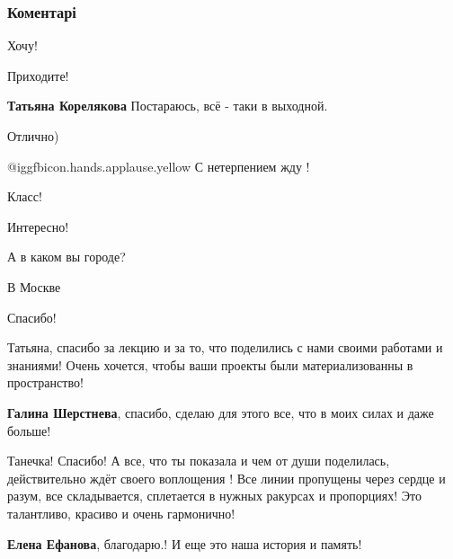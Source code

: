  
 
 
 
 
\subsubsection{Коментарі}
\label{sec:16_11_2018.fb.koreljakova_tatjana.hudozhnik.rossia.1.lekcia_starorjazan_atlantida.cmt}

\begin{itemize} %
Хочу!

Приходите!

\textbf{Татьяна Корелякова} Постараюсь, всё - таки в выходной.

Отлично)

 @igg{fbicon.hands.applause.yellow}  С нетерпением жду !

Класс!

Интересно!

А в каком вы городе?

В Москве

Спасибо!


Татьяна, спасибо за лекцию и за то, что поделились с нами своими работами и
знаниями! Очень хочется, чтобы ваши проекты были материализованны в пространство!

\begin{itemize} %
\textbf{Галина Шерстнева}, спасибо, сделаю для этого все, что в моих силах и даже больше!

Танечка! Спасибо! А все, что ты показала и чем от души поделилась, действительно ждёт своего воплощения ! Все линии пропущены через сердце и разум, все складывается, сплетается в нужных ракурсах и пропорциях! Это талантливо, красиво и очень гармонично!

\textbf{Елена Ефанова}, благодарю.! И еще это наша история и память!


\end{itemize}
\end{itemize}
